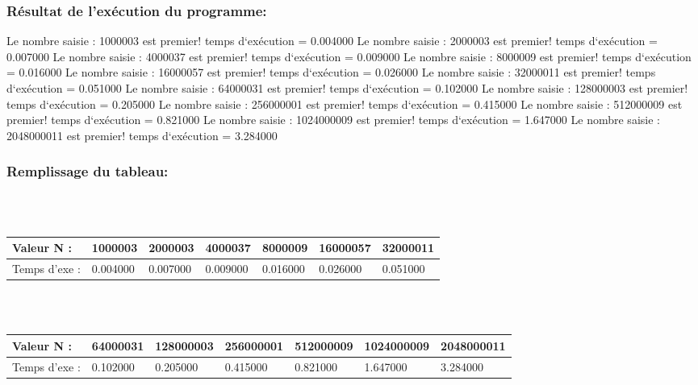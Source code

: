 \documentclass[12pt]{article}
\begin{document}
\subsubsection{Résultat de l'exécution du programme:}
\begin{sql}
Le nombre saisie : 1000003 est premier!
temps d`exécution = 0.004000
Le nombre saisie : 2000003 est premier!
temps d`exécution = 0.007000
Le nombre saisie : 4000037 est premier!
temps d`exécution = 0.009000
Le nombre saisie : 8000009 est premier!
temps d`exécution = 0.016000
Le nombre saisie : 16000057 est premier!
temps d`exécution = 0.026000
Le nombre saisie : 32000011 est premier!
temps d`exécution = 0.051000
Le nombre saisie : 64000031 est premier!
temps d`exécution = 0.102000
Le nombre saisie : 128000003 est premier!
temps d`exécution = 0.205000
Le nombre saisie : 256000001 est premier!
temps d`exécution = 0.415000
Le nombre saisie : 512000009 est premier!
temps d`exécution = 0.821000
Le nombre saisie : 1024000009 est premier!
temps d`exécution = 1.647000
Le nombre saisie : 2048000011 est premier!
temps d`exécution = 3.284000

\end{sql}


\subsubsection{Remplissage du tableau:}
\color{blue}
\textrm{  }
\\
\\
\begin{tabular}{|p{3cm}||p{1.8cm}|p{1.8cm}|p{1.8cm}|p{1.8cm}|p{1.8cm}|p{1.8cm}|}
\hline
Valeur N : & 1000003 & 2000003 & 4000037 & 8000009 & 16000057  & 32000011\\
\hline
Temps d'exe : & 0.004000 & 0.007000 & 0.009000 & 0.016000 & 0.026000 & 0.051000 \\
\hline
\end{tabular}
\\
\\
\begin{tabular}{|p{3cm}||p{1.8cm}|p{1.8cm}|p{1.8cm}|p{1.8cm}|p{1.8cm}|p{1.8cm}|}
\hline
Valeur N : & 64000031 & 128000003 & 256000001 & 512000009 &  1024000009 & 2048000011\\
\hline
Temps d'exe : &  0.102000 & 0.205000 & 0.415000 & 0.821000 &  1.647000 & 3.284000 \\
\hline
\end{tabular}


\textrm{  }
\\
\color{black}
\end{document}

